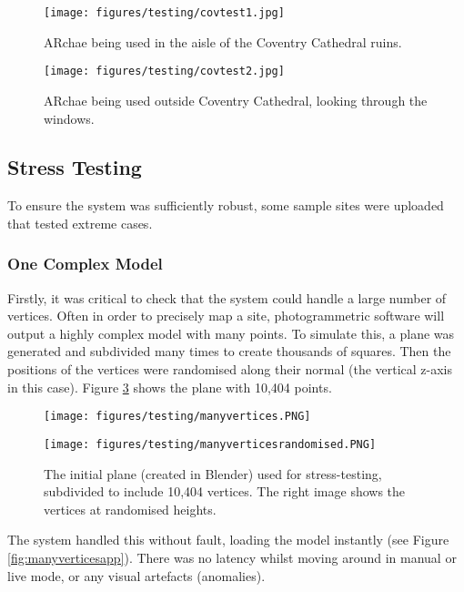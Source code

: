 \documentclass[12pt, a4paper]{article}
\begin{document}
\begin{figure}[H]
\centering
    \texttt{[image: figures/testing/covtest1.jpg]}
        \caption{ARchae being used in the aisle of the Coventry Cathedral ruins.}
        \label{fig:cath1}
\end{figure}

\begin{figure}[H]
\centering
    \texttt{[image: figures/testing/covtest2.jpg]}
        \caption{ARchae being used outside Coventry Cathedral, looking through the windows.}
        \label{fig:cath2}
\end{figure}

\newpage
\subsection{Stress Testing}
To ensure the system was sufficiently robust, some sample sites were uploaded that tested extreme cases.

\subsubsection{One Complex Model}
Firstly, it was critical to check that the system could handle a large number of vertices. Often in order to precisely map a site, photogrammetric software will output a highly complex model with many points. To simulate this, a plane was generated and subdivided many times to create thousands of squares. Then the positions of the vertices were randomised along their normal (the vertical z-axis in this case). Figure \ref{fig:stressplane} shows the plane with 10,404 points.

\begin{figure}[H]
\centering
\begin{minipage}{.5\textwidth}
  \centering
  \texttt{[image: figures/testing/manyvertices.PNG]}
\end{minipage}%
\begin{minipage}{.5\textwidth}
  \centering
  \texttt{[image: figures/testing/manyverticesrandomised.PNG]}
\end{minipage}
\caption{The initial plane (created in Blender) used for stress-testing, subdivided to include 10,404 vertices. The right image shows the vertices at randomised heights.}
\label{fig:stressplane}
\end{figure}

The system handled this without fault, loading the model instantly (see Figure \ref{fig:manyverticesapp}). There was no latency whilst moving around in manual or live mode, or any visual artefacts (anomalies). 
\end{document}
